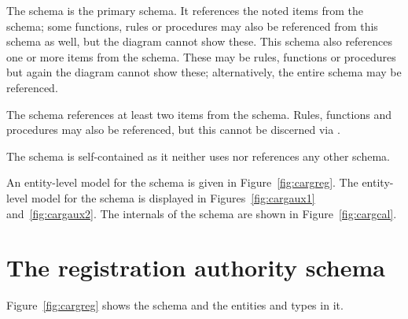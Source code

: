 \documentclass{article}
\begin{document}
The schema  is the primary schema. It references
the noted items from the  schema; some functions, rules or
procedures may also be referenced from this schema as well, but the diagram
cannot show these. This schema also references one or more items from the
 schema. These may be rules, functions or procedures but again
the diagram cannot show these; alternatively, the entire schema may be
referenced.

The  schema references at least two items from the
 schema. Rules, functions and procedures may also be
referenced, but this cannot be discerned via \ExpressG.

The  schema is self-contained as it neither uses nor references
any other schema.

An entity-level model for the  schema is given
in Figure~\ref{fig:cargreg}. The entity-level model for the 
schema is displayed in Figures~\ref{fig:cargaux1} and~\ref{fig:cargaux2}. The
internals of the  schema are shown in Figure~\ref{fig:cargcal}.

\clearpage

\section{The registration authority schema}

Figure~\ref{fig:cargreg} shows the  schema and
the entities and types in it.
\end{document}
